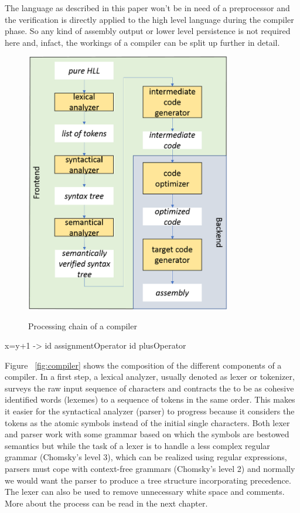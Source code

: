 The language as described in this paper won't be in need of a preprocessor and the verification is directly applied to the high level language during the compiler phase. So any kind of assembly output or lower level persistence is not required here and, infact, the workings of a compiler can be split up further in detail.

%

\begin{figure}[H]
	\centering
	{\includegraphics[width=9cm]{compiler.png}}

	\label{compiler}
	\caption{Processing chain of a compiler}
\end{figure}

x=y+1 -> id assignmentOperator id plusOperator 

Figure ~\ref{fig:compiler} shows the composition of the different components of a compiler. In a first step, a lexical analyzer, usually denoted as lexer or tokenizer, surveys the raw input sequence of characters and contracts the to be as cohesive identified words (lexemes) to a sequence of tokens in the same order. This makes it easier for the syntactical analyzer (parser) to progress because it considers the tokens as the atomic symbols instead of the initial single characters. Both lexer and parser work with some grammar based on which the symbols are bestowed semantics but while the task of a lexer is to handle a less complex regular grammar (Chomsky's level 3), which can be realized using regular expressions, parsers must cope with context-free grammars (Chomsky's level 2) and normally we would want the parser to produce a tree structure incorporating precedence. The lexer can also be used to remove unnecessary white space and comments. More about the process can be read in the next chapter.

